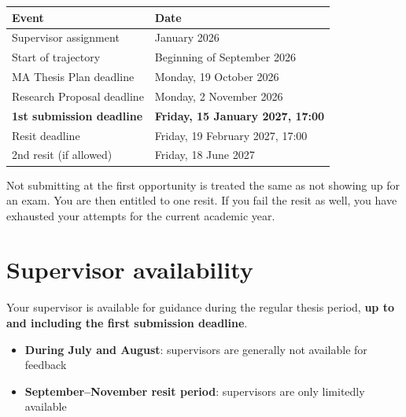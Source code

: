 \documentclass[
  11pt,
  a4paper,
]{scrbook}
\providecommand{\tightlist}{%
  \setlength{\itemsep}{0pt}\setlength{\parskip}{0pt}}\usepackage{longtable,booktabs,array}
\begin{document}
\begin{longtable}[]{@{}ll@{}}
\toprule\noalign{}
Event & Date \\
\midrule\noalign{}
\endhead
\bottomrule\noalign{}
\endlastfoot
Supervisor assignment & January 2026 \\
Start of trajectory & Beginning of September 2026 \\
MA Thesis Plan deadline & Monday, 19 October 2026 \\
Research Proposal deadline & Monday, 2 November 2026 \\
\textbf{1st submission deadline} & \textbf{Friday, 15 January 2027,
17:00} \\
Resit deadline & Friday, 19 February 2027, 17:00 \\
2nd resit (if allowed) & Friday, 18 June 2027 \\
\end{longtable}

\begin{tcolorbox}[enhanced jigsaw, bottomrule=.15mm, opacityback=0, toprule=.15mm, colframe=quarto-callout-important-color-frame, left=2mm, rightrule=.15mm, title=\textcolor{quarto-callout-important-color}{\faExclamation}\hspace{0.5em}{Missing the first deadline = missing an exam opportunity}, colbacktitle=quarto-callout-important-color!10!white, bottomtitle=1mm, colback=white, breakable, toptitle=1mm, titlerule=0mm, leftrule=.75mm, arc=.35mm, opacitybacktitle=0.6, coltitle=black]

Not submitting at the first opportunity is treated the same as not
showing up for an exam. You are then entitled to one resit. If you fail
the resit as well, you have exhausted your attempts for the current
academic year.

\end{tcolorbox}

\section{Supervisor availability}\label{supervisor-availability}

Your supervisor is available for guidance during the regular thesis
period, \textbf{up to and including the first submission deadline}.

\begin{itemize}
\tightlist
\item
  \textbf{During July and August}: supervisors are generally not
  available for feedback
\item
  \textbf{September--November resit period}: supervisors are only
  limitedly available
\end{itemize}
\end{document}
